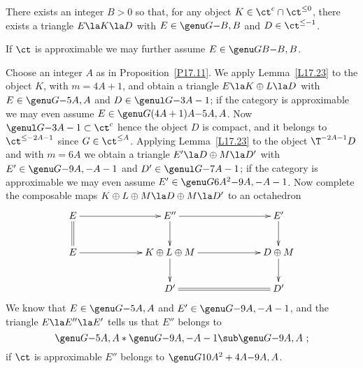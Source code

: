 \documentclass[11pt]{amsart}
\begin{document}
There exists an integer $B>0$ so that,
for any object $K\in\ct^c\cap\ct^{\leq0}$,
there exists  a triangle
$E\la K\la D$ with $E\in\genu G{}{-B,B}$ and
$D\in\ct^{\leq-1}$.

If $\ct$ is approximable we may further assume $E\in\genu G{B}{-B,B}$.
\elem

\prf
Choose an
integer $A$ as in Proposition~\ref{P17.11}.
We apply Lemma~\ref{L17.23} to the object $K$, with $m=4A+1$,
and obtain a triangle
$E\la K\oplus L\la D$ with $E\in\genu G{}{-5A,A}$ and
$D\in\genul G{}{-3A-1}$; if the category is
approximable we may even assume $E\in\genu G{(4A+1)A}{-5A,A}$.
Now $\genul G{}{-3A-1}\subset\ct^c$ hence the object
$D$ is compact, and it belongs to $\ct^{\leq-2A-1}$
since $G\in\ct^{\leq A}$. Applying
Lemma~\ref{L17.23} to the object $\T^{-2A-1}D$ and with $m=6A$
we obtain a triangle $E'\la D\oplus M\la D'$ with
$E'\in\genu G{}{-9A,-A-1}$ and
$D'\in\genul G{}{-7A-1}$; if the category is
approximable we may even assume $E'\in\genu G{6A^2}{-9A,-A-1}$.
Now complete the composable 
maps
$K\oplus L\oplus M\la D\oplus M\la D'$ to an
octahedron
\[\xymatrix@C+40pt{
E\ar@{=}[d]\ar[r] & E''\ar[r]\ar[d] & E'\ar[d]\\
E\ar[r] & K\oplus L\oplus M\ar[r]\ar[d] & D\oplus M\ar[d] \\
        & D'\ar@{=}[r] & D'
}\]
We know that $E\in\genu G{}{-5A,A}$ and $E'\in\genu G{}{-9A,-A-1}$,
and the triangle $E\la E''\la E'$ tells us that
$E''$ belongs to
\[
\genu G{}{-5A,A} *\genu G{}{-9A,-A-1}\sub
\genu G{}{-9A,A}\ ;
\]
if $\ct$ is approximable  $E''$ belongs to $\genu G{10A^2+4A}{-9A,A}$.
\end{document}
